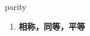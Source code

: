 
\begin{frame}
{\huge parity}
\begin{center}
\begin{enumerate}\Large
  \item \textbf{相称，同等，平等}
\end{enumerate}
\end{center}
\end{frame}
